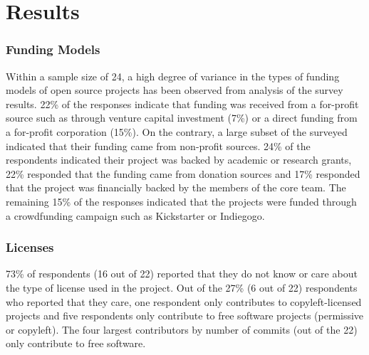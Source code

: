 \section{Results}
































\subsubsection{Funding Models}
Within a sample size of 24, a high degree of variance in the types of funding models of open source projects has been observed from analysis of the survey results. 22\% of the responses indicate that funding was received from a for-profit source such as through venture capital investment (7\%) or a direct funding from a for-profit corporation (15\%). On the contrary, a large subset of the surveyed indicated that their funding came from non-profit sources. 24\% of the respondents indicated their project was backed by academic or research grants, 22\% responded that the funding came from donation sources and 17\% responded that the project was financially backed by the members of the core team. The remaining 15\% of the responses indicated that the projects were funded through a crowdfunding campaign such as Kickstarter or Indiegogo.


\subsubsection{Licenses}

73\% of respondents (16 out of 22) reported that they do not know or care about the type of license used in the project. Out of the 27\% (6 out of 22) respondents who reported that they care, one respondent only contributes to copyleft-licensed projects and five respondents only contribute to free software projects (permissive or copyleft). The four largest contributors by number of commits (out of the 22) only contribute to free software.
